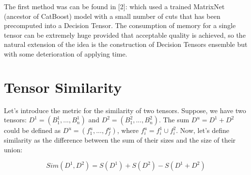 \documentclass[a4paper]{jpconf}
\begin{document}
The first method was can be found in [2]: which used a trained MatrixNet (ancestor of CatBoost) model with a small number of cuts that has been precomputed into a Decision Tensor.
The consumption of memory for a single tensor can be extremely huge provided that acceptable quality is achieved, so the natural extension of the idea is the construction of Decision Tensors ensemble but with some deterioration of applying time.

\section{Tensor Similarity}
Let's introduce the metric for the similarity of two tensors. Suppose, we have two tensors: $D^1 = (B^{1}_{1}, ..., B^{1}_{n})$ and $D^2 = (B^{2}_{1}, ..., B^{2}_{n})$. The sum $D^u = D^1 + D^2$ could be defined as $D^u = (f^{u}_{1}, ..., f^{u}_{f})$, where $f^{u}_{i} = f^{1}_{i} \cup f^{2}_{i}$. Now, let's define similarity as the difference between the sum of their sizes and the size of their union:

$$Sim(D^1, D^2) = S(D^1) + S(D^2) - S(D^1 + D^2)$$



\end{document}
